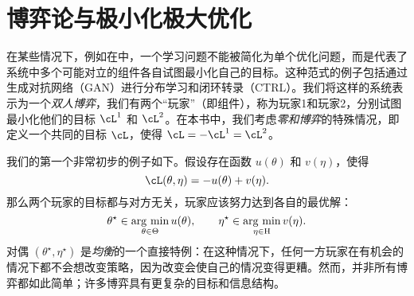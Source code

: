 \documentclass[../../book-main_zh.tex]{subfiles}
\begin{document}
\section{博弈论与极小化极大优化} \label{sec:minimax}\label{sec:game_theory}

在某些情况下，例如在中，一个学习问题不能被简化为单个优化问题，而是代表了系统中多个可能对立的组件各自试图最小化自己的目标。这种范式的例子包括通过生成对抗网络（GAN）进行分布学习和闭环转录（CTRL）。我们将这样的系统表示为一个\textit{双人博弈}，我们有两个“玩家”（即组件），称为玩家1和玩家2，分别试图最小化他们的目标 \(\cL^{1}\) 和 \(\cL^{2}\)。在本书中，我们考虑\textit{零和博弈}的特殊情况，即定义一个共同的目标 \(\cL\)，使得 \(\cL = -\cL^{1} = \cL^{2}\)。

我们的第一个非常初步的例子如下。假设存在函数 \(u(\theta)\) 和 \(v(\eta)\)，使得
\begin{equation}
    \cL(\theta, \eta) = -u(\theta) + v(\eta).
\end{equation}
那么两个玩家的目标都与对方无关，玩家应该努力达到各自的最优解：
\begin{equation}
    \theta^{\star} \in \operatorname*{arg\ min}_{\theta \in \Theta}u(\theta), \qquad \eta^{\star} \in \operatorname*{arg\ min}_{\eta \in \mathrm{H}}v(\eta).
\end{equation}
对偶 \((\theta^{\star}, \eta^{\star})\) 是\textit{均衡}的一个直接特例：在这种情况下，任何一方玩家在有机会的情况下都不会想改变策略，因为改变会使自己的情况变得更糟。然而，并非所有博弈都如此简单；许多博弈具有更复杂的目标和信息结构。
\end{document}
